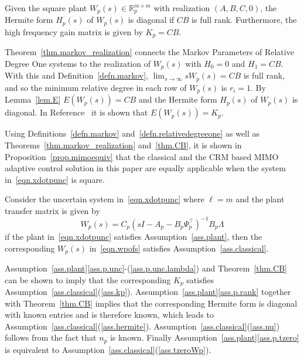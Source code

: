\begin{thm-dan}\label{thm.CB}
  Given the square plant $W_{p}(s)\in\mathbb{R}_{p}^{m\times m}$ with realization $(A,B,C,0)$, the Hermite form $H_{p}(s)$ of $W_{p}(s)$ is diagonal if $CB$ is full rank.
  Furthermore, the high frequency gain matrix is given by $K_{p}=CB$.
\end{thm-dan}

\begin{proof-dan}
  Theorem~\ref{thm.markov_realization} connects the Markov Parameters of Relative Degree One systems to the realization of $W_{p}(s)$ with $H_{0}=0$ and $H_{1}=CB$.
  With this and Definition~\ref{defn.markov}, $\lim_{s\rightarrow\infty}sW_{p}(s)=CB$ is full rank, and so the minimum relative degree in each row of $W_{p}(s)$ is $r_{i}=1$.
  By Lemma~\ref{lem.E} $E(W_{p}(s))=CB$ and the Hermite form $H_{p}(s)$ of $W_{p}(s)$ is diagonal.
  In Reference\ \cite{narendra.stable.2005} it is shown that $E(W_{p}(s))=K_{p}$.
\end{proof-dan}

Using Definitions~\ref{defn.markov} and~\ref{defn.relativedegreeone} as well as Theorems~\ref{thm.markov_realization} and~\ref{thm.CB}, it is shown in Proposition~\ref{prop.mimoequiv} that the classical and the CRM based MIMO adaptive control solution in this paper are equally applicable when the system in\ \eqref{eqn.xdotpunc} is square.

\begin{prop-dan}\label{prop.mimoequiv}
  Consider the uncertain system in\ \eqref{eqn.xdotpunc} where $\ell=m$ and the plant transfer matrix is given by
  \begin{equation}
    \label{eqn.wpofs}
    W_{p}(s)=C_{p}(sI-A_{p}-B_{p} \Psi_{p}^{\top})^{-1}B_{p}\Lambda
  \end{equation}
  if the plant in\ \eqref{eqn.xdotpunc} satisfies Assumption~\ref{ass.plant}, then the corresponding $W_p(s)$ in\ \eqref{eqn.wpofs} satisfies Assumption~\ref{ass.classical}.
\end{prop-dan}

\begin{proof-dan}
  Assumption~\ref{ass.plant}\ref{ass.p.unc}-(\ref{ass.p.unc.lambda}) and Theorem~\ref{thm.CB} can be shown to imply that the corresponding $K_p$ satisfies Assumption~\ref{ass.classical}(\ref{ass.kp}).
  Assumption~\ref{ass.plant}\ref{ass.p.rank} together with Theorem~\ref{thm.CB} implies that the corresponding Hermite form is diagonal with known entries and is therefore known, which leads to Assumption~\ref{ass.classical}(\ref{ass.hermite}).
  Assumption~\ref{ass.classical}(\ref{ass.nu}) follows from the fact that $n_{p}$ is known.
  Finally Assumption~\ref{ass.plant}\ref{ass.p.tzero} is equivalent to Assumption~\ref{ass.classical}(\ref{ass.tzeroWp}).
\end{proof-dan}

